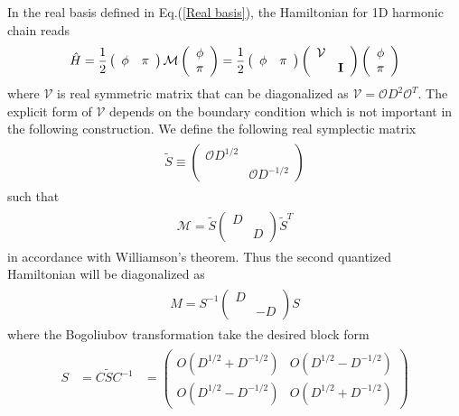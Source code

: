 In the real basis defined in Eq.(\ref{Real basis}), the Hamiltonian for 1D harmonic chain reads
\begin{eqnarray}\begin{aligned}
\hat{H}
=\frac{1}{2}
\left(\begin{array}{ccc}
\phi & \pi
\end{array}\right)
\mathcal{M}
\left(\begin{array}{ccc}
\phi\\
\pi
\end{array}\right)
=\frac{1}{2}
\left(\begin{array}{ccc}
\phi & \pi
\end{array}\right)
\left(\begin{array}{ccc}
\mathcal{V} \\
& {\bf I}
\end{array}\right)
\left(\begin{array}{ccc}
\phi\\
\pi
\end{array}\right)
\end{aligned}\end{eqnarray}
where $\mathcal{V}$ is real symmetric matrix that can be diagonalized as $\mathcal{V}=\mathcal{O}D^2\mathcal{O}^T$. The explicit form of $\mathcal{V}$ depends on the boundary condition which is not important in the following construction. We define the following real symplectic matrix
\begin{eqnarray}\begin{aligned}
\tilde{S}\equiv\left(\begin{array}{ccc}
\mathcal{O}D^{1/2} \\
& \mathcal{O}D^{-1/2}
\end{array}\right)
\end{aligned}\end{eqnarray}
such that 
\begin{eqnarray}\begin{aligned}
\mathcal{M}=\tilde{S}\left(\begin{array}{ccc}
D \\ 
& D
\end{array}\right)
\tilde{S}^T
\end{aligned}\end{eqnarray}
in accordance with Williamson's theorem. Thus the second quantized Hamiltonian will be diagonalized as
\begin{eqnarray}\begin{aligned}
M=S^{-1}\left(\begin{array}{ccc}
D \\
& -D
\end{array}\right)S
\end{aligned}\end{eqnarray}
where the Bogoliubov transformation take the desired block form
\begin{eqnarray}\begin{aligned}
S&=C\tilde{S}C^{-1}
&=\left(\begin{array}{ccc}
O(D^{1/2}+D^{-1/2}) & O(D^{1/2}-D^{-1/2}) \\
O(D^{1/2}-D^{-1/2}) & O(D^{1/2}+D^{-1/2}) 
\end{array}\right)
\end{aligned}\end{eqnarray}


